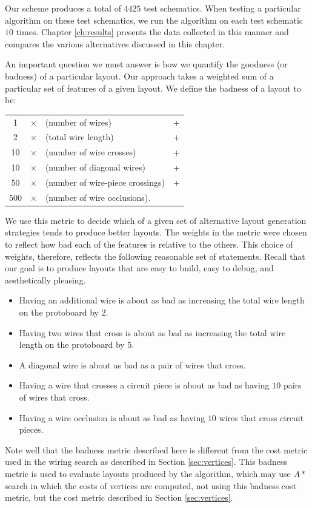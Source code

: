 Our scheme produces a total of $4425$ test schematics.
When testing a particular algorithm on these test
schematics, we run the algorithm on each test schematic $10$ times. Chapter
\ref{ch:results} presents the data collected in this manner and compares the
various alternatives discussed in this chapter.

An important question we must answer is how we quantify the goodness (or badness)
of a particular layout. Our approach takes a weighted sum of a particular set of
features of a given layout. We define the badness of a layout to be:
\begin{table}[H]
\centering
\begin{tabular}{ccll}
1 &$\times$ &(number of wires) &+ \\
2 &$\times$ &(total wire length) &+ \\
10 &$\times$ &(number of wire crosses) &+ \\
10 &$\times$ &(number of diagonal wires) &+ \\
50 &$\times$ &(number of wire-piece crossings) &+ \\
500 &$\times$ &(number of wire occlusions).
\end{tabular}
\end{table}
We use this metric to decide which of a given set of alternative
layout generation strategies tends to produce better layouts.
The weights in the metric were chosen to reflect how
bad each of the features is relative to the others. This choice of weights,
therefore, reflects the following reasonable set of statements. Recall that our
goal is to produce layouts that are easy to build, easy to debug, and
aesthetically pleasing.
\begin{itemize}
\item Having an additional wire is about as bad as increasing the total wire
length on the protoboard by $2$.
\item Having two wires that cross is about as bad as increasing the total
wire length on the protoboard by $5$.
\item A diagonal wire is about as bad as a pair of wires that cross.
\item Having a wire that crosses a circuit piece is about as bad as having $10$
pairs of wires that cross.
\item Having a wire occlusion is about as bad as having $10$ wires that cross
circuit pieces.
\end{itemize}

Note well that the badness metric described here is different from the cost
metric used in the wiring search as described in Section \ref{sec:vertices}.
This badness metric is used to evaluate layouts produced by the algorithm,
which may use $A*$ search in which the costs of vertices are computed, not using
this badness cost metric, but the cost metric described in Section
\ref{sec:vertices}.
